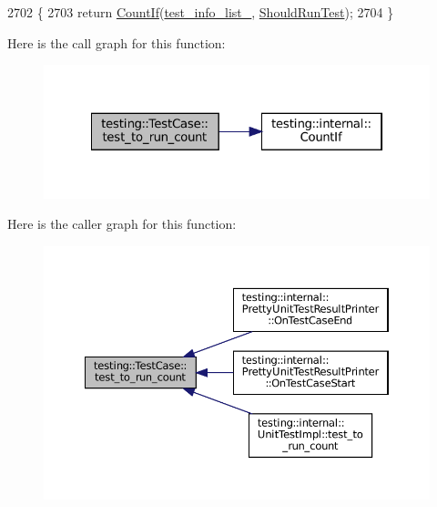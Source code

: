 \begin{DoxyCode}
2702                                       \{
2703   \textcolor{keywordflow}{return} \hyperlink{namespacetesting_1_1internal_a1e77a774d910346eff11a86d8df783a5}{CountIf}(\hyperlink{classtesting_1_1TestCase_adce272a48399dd67a7bdd14fa7e99b80}{test\_info\_list\_}, \hyperlink{classtesting_1_1TestCase_a75eb139557c43362f94916cfd6762c94}{ShouldRunTest});
2704 \}
\end{DoxyCode}
Here is the call graph for this function\+:
\nopagebreak
\begin{figure}[H]
\begin{center}
\leavevmode
\includegraphics[width=322pt]{classtesting_1_1TestCase_a57f115315eb756e23be6651bb5e6c638_cgraph}
\end{center}
\end{figure}
Here is the caller graph for this function\+:
\nopagebreak
\begin{figure}[H]
\begin{center}
\leavevmode
\includegraphics[width=350pt]{classtesting_1_1TestCase_a57f115315eb756e23be6651bb5e6c638_icgraph}
\end{center}
\end{figure}
\mbox{\label{classtesting_1_1TestCase_a2c6989cdeac01b2153f2e34dca1dbde6}} 
